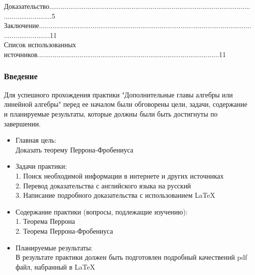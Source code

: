 \documentclass[a4paper,12pt,leqno]{article} %
\begin{document}
\noindent\quad Доказательство..................................................................................................................................5 \\

\noindent\quad Заключение.......................................................................................................................................11	\\

\noindent\quad Список использованных источников...............................................................................................11
\newpage
\subsubsection*{Введение}
\quad Для успешного прохождения практики "Дополнительные главы алгебры или линейной алгебры" 
\quad перед ее началом были обговорены цели, задачи, содержание и планируемые результаты, которые должны были быть достигнуты по завершении. 
\begin{itemize}
\item Главная цель:\\ 
\quad Доказать теорему Перрона-Фробениуса
\item Задачи практики: \\
1. Поиск необходимой информации в интернете и других источниках \\
2. Перевод доказательства с английского языка на русский \\ 
3. Написание подробного доказательства с использованием \LaTeX \\
\item Содержание практики (вопросы, подлежащие изучению): \\
1. Теорема Перрона \\
2. Теорема Перрона-Фробениуса\\
\item Планируемые результаты: \\
В результате практики должен быть подготовлен подробный качественнй pdf файл,
набранный в \LaTeX \\
\end{itemize}
\end{document}
